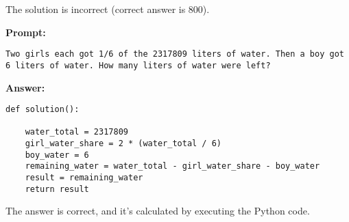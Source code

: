 The solution is incorrect (correct answer is 800).
\begin{displayquote}
	\textbf{Prompt:}
	\begin{Verbatim}[fontsize=\small,breaklines]
Two girls each got 1/6 of the 2317809 liters of water. Then a boy got 6 liters of water. How many liters of water were left?
	\end{Verbatim}
	\textbf{Answer:}
	\begin{Verbatim}[fontsize=\small,breaklines]
def solution():

    water_total = 2317809
    girl_water_share = 2 * (water_total / 6)
    boy_water = 6
    remaining_water = water_total - girl_water_share - boy_water
    result = remaining_water
    return result
	\end{Verbatim}
\end{displayquote}
The answer is correct, and it's calculated by executing the Python code.
